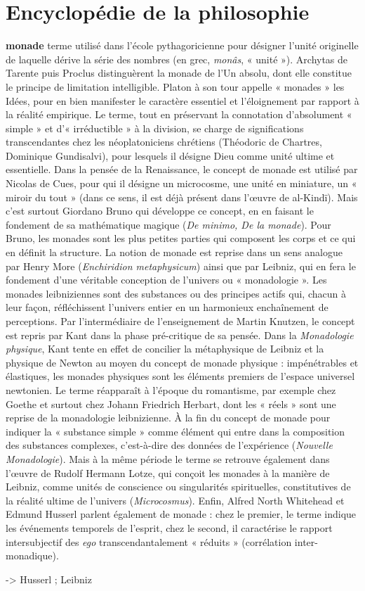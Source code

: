 
\section{Encyclopédie de la philosophie}
{\bf monade} terme utilisé dans l’école pythagoricienne pour désigner l’unité originelle
de laquelle dérive la série des nombres
(en grec, {\it monâs}, « unité »). Archytas de
Tarente puis Proclus distinguèrent la
monade de l’Un absolu, dont elle constitue le principe de limitation intelligible.
Platon à son tour appelle « monades » les
Idées, pour en bien manifester le caractère essentiel et l'éloignement par rapport
à la réalité empirique. Le terme, tout en
préservant la connotation d’absolument
« simple » et d’« irréductible » à la division, se charge de significations transcendantes chez les néoplatoniciens chrétiens
(Théodoric de Chartres, Dominique Gundisalvi), pour lesquels il désigne Dieu
comme unité ultime et essentielle. Dans
la pensée de la Renaissance, le concept de
monade est utilisé par Nicolas de Cues,
pour qui il désigne un microcosme, une
unité en miniature, un « miroir du tout »
(dans ce sens, il est déjà présent dans
l’œuvre de al-Kindï). Mais c’est surtout
Giordano Bruno qui développe ce
concept, en en faisant le fondement de sa
mathématique magique ({\it De minimo, De
la monade}). Pour Bruno, les monades
sont les plus petites parties qui composent
les corps et ce qui en définit la structure.
La notion de monade est reprise dans un
sens analogue par Henry More ({\it Enchiridion metaphysicum}) ainsi que par Leibniz, qui en fera le fondement d’une
véritable conception de l’univers ou « monadologie ». Les monades leibniziennes
sont des substances ou des principes actifs
qui, chacun à leur façon, réfléchissent
l'univers entier en un harmonieux enchaînement de perceptions. Par l’intermédiaire de l’enseignement de Martin
Knutzen, le concept est repris par Kant
dans la phase pré-critique de sa pensée.
Dans la {\it Monadologie physique}, Kant
tente en effet de concilier la métaphysique de Leibniz et la physique de Newton au moyen du concept de monade
physique : impénétrables et élastiques, les
monades physiques sont les éléments premiers de l’espace universel newtonien.
Le terme réapparaît à l’époque du
romantisme, par exemple chez Goethe et
surtout chez Johann Friedrich Herbart,
dont les « réels » sont une reprise de la
monadologie leibnizienne. À la fin du
concept de monade pour indiquer la
« substance simple » comme élément qui
entre dans la composition des substances
complexes, c’est-à-dire des données de
l'expérience ({\it Nouvelle  Monadologie}).
Mais à la même période le terme se
retrouve également dans l’œuvre de
Rudolf Hermann Lotze, qui conçoit les
monades à la manière de Leibniz, comme
unités de conscience ou singularités spirituelles, constitutives de la réalité ultime
de l’univers ({\it Microcosmus}). Enfin, Alfred
North Whitehead et Edmund Husserl
parlent également de monade : chez le
premier, le terme indique les événements
%
temporels de l’esprit, chez le second, il
caractérise le rapport intersubjectif des
{\it ego} transcendantalement « réduits » (corrélation inter-monadique).

 

 -> Husserl ; Leibniz

